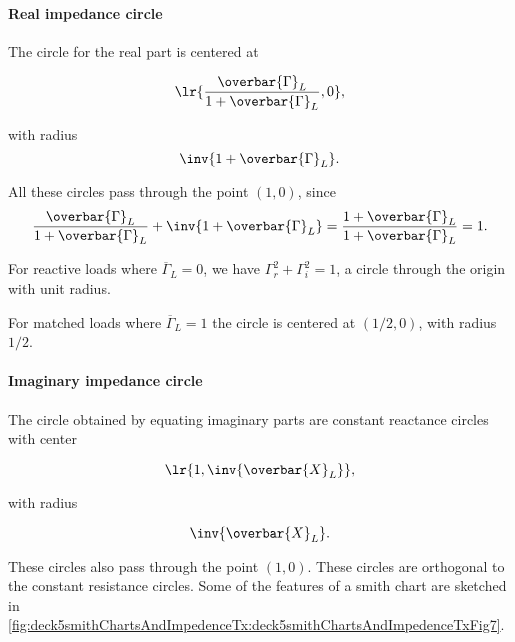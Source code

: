 \paragraph{Real impedance circle}

The circle for the real part is centered at 

\begin{dmath}\label{eqn:uwavesDeck5SmithChartCore:580}
\lr{ \frac{\overbar{\Gamma}_L}{1 + \overbar{\Gamma}_L }, 0 },
\end{dmath}

with radius
\begin{dmath}\label{eqn:uwavesDeck5SmithChartCore:600}
\inv{1 + \overbar{\Gamma}_L }.
\end{dmath}

All these circles pass through the point \( (1,0) \), since
\begin{dmath}\label{eqn:uwavesDeck5SmithChartCore:620}
\frac{\overbar{\Gamma}_L}{1 + \overbar{\Gamma}_L } + \inv{1 + \overbar{\Gamma}_L }
=
\frac{1 + \overbar{\Gamma}_L}{1 + \overbar{\Gamma}_L }
= 1.
\end{dmath}

For reactive loads where \( \overbar{\Gamma}_L = 0 \), we have \( \Gamma_r^2 + \Gamma_i^2 = 1 \), a circle through the origin with unit radius.

For matched loads where \( \overbar{\Gamma}_L = 1 \) the circle is centered at \( (1/2, 0) \), with radius \( 1/2 \).

\paragraph{Imaginary impedance circle}

The circle obtained by equating imaginary parts are constant reactance circles with center

\begin{dmath}\label{eqn:uwavesDeck5SmithChartCore:640}
\lr{ 1, \inv{\overbar{X}_L } }, 
\end{dmath}

with radius 

\begin{dmath}\label{eqn:uwavesDeck5SmithChartCore:660}
\inv{\overbar{X}_L}.
\end{dmath}

These circles also pass through the point \( (1,0) \).  These circles are orthogonal to the constant resistance circles.  Some of the features of a smith chart are sketched in \cref{fig:deck5smithChartsAndImpedenceTx:deck5smithChartsAndImpedenceTxFig7}.

